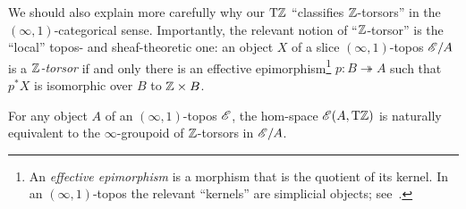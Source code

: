\documentclass[a4paper,12pt]{amsart}
\begin{document}
We should also explain more carefully why our ${\mathrm{T}\mathbb{Z}}$ ``classifies $\mathbb{Z}$-torsors'' in the $(\infty,1)$-categorical sense.
Importantly, the relevant notion of ``$\mathbb{Z}$-torsor'' is the ``local'' topos- and sheaf-theoretic one: an object $X$ of a slice $(\infty,1)$-topos $\mathscr{E}/A$ is a \emph{$\mathbb{Z}$-torsor} if and only there is an effective epimorphism\footnote{An \emph{effective epimorphism} is a morphism that is the quotient of its kernel.  In an $(\infty,1)$-topos the relevant ``kernels'' are simplicial objects; see~\cite[Section 6.2.3]{lurie:higher-topoi}.} $p:B \twoheadrightarrow A$ such that $p^*X$ is isomorphic over $B$ to $\mathbb{Z}\times B$.

\begin{theorem}\label{thm:torz-classif}
  For any object $A$ of an $(\infty,1)$-topos $\mathscr{E}$, the hom-space $\mathscr{E}(A,{\mathrm{T}\mathbb{Z}})$ is naturally equivalent to the $\infty$-groupoid of $\mathbb{Z}$-torsors in $\mathscr{E}/A$.
\end{theorem}
\end{document}
